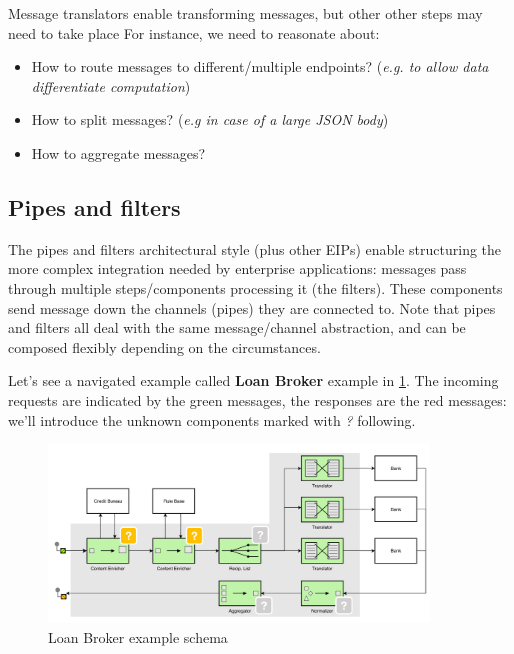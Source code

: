 \documentclass[10pt,a4paper]{report}
\begin{document}
Message translators enable transforming messages, but other other steps may need to take place
For instance, we need to reasonate about:
\begin{itemize}
	\item How to route messages to different/multiple endpoints? (\textit{e.g. to allow data differentiate computation})
	\item How to split messages? (\textit{e.g in case of a large JSON body})
	\item How to aggregate messages?
\end{itemize}

\subsection{Pipes and filters}
The pipes and filters architectural style (plus other EIPs) enable structuring the more complex integration needed by enterprise applications: messages pass through multiple steps/components processing it (the filters). These components send message down the channels (pipes) they are connected to. 
Note that pipes and filters all deal with the same message/channel abstraction, and can be composed flexibly depending on the circumstances. 

Let's see a navigated example called \textbf{Loan Broker} example in \ref{image42}. The incoming requests are indicated by the green messages, the responses are the red messages: we'll introduce the unknown components marked with \textit{?} following. 
  \begin{figure}[h]
	\centering
	\includegraphics[width=0.9\textwidth]{image42}
	\caption{Loan Broker example schema}
	\label{image42}
\end{figure}
\end{document}
